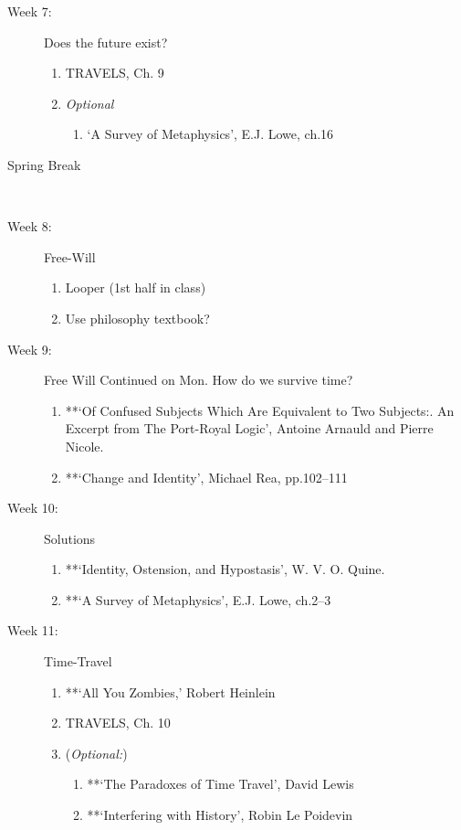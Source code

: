 \documentclass[article,oneside]{memoir}
\begin{document}
\begin{description}
\item[Week 7:] Does the future exist? 
\begin{enumerate}
\item TRAVELS, Ch. 9
\item \emph{Optional}
\begin{enumerate}
\item `A Survey of Metaphysics', E.J. Lowe, ch.16
\end{enumerate}
\end{enumerate}
\item[Spring Break]\


\item[Week 8:] Free-Will
\begin{enumerate}
\item Looper (1st half in class)
\item Use philosophy textbook? 
\end{enumerate}


\item[Week 9:] Free Will Continued on Mon. How do we survive time? 
\begin{enumerate}
\item **`Of Confused Subjects Which Are Equivalent to Two Subjects:. An Excerpt from The Port-Royal Logic', Antoine Arnauld and Pierre Nicole. 
\item **`Change and Identity', Michael Rea, pp.102--111 
\end{enumerate}

\item[Week 10:] Solutions 
\begin{enumerate}
 \item **`Identity, Ostension, and Hypostasis', W. V. O. Quine.
\item **`A Survey of Metaphysics', E.J. Lowe, ch.2--3

\end{enumerate}

\item[Week 11:]  Time-Travel
\begin{enumerate}
\item **`All You Zombies,'  Robert Heinlein
\item TRAVELS, Ch. 10 
\item (\emph{Optional:})
\begin{enumerate}
\item **`The Paradoxes of Time Travel', David Lewis
\item **`Interfering with History', Robin Le Poidevin 
\end{enumerate}
\end{enumerate}


\end{description}
\end{document}
